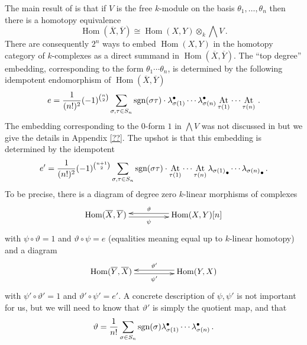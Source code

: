 \documentclass{compositio}
\theoremstyle{definition}
\numberwithin{equation}{section}
\def\Hom{\operatorname{Hom}}
\DeclareMathOperator{\At}{At}
\begin{document}
The main result of \cite{??} is that if $V$ is the free $k$-module on the basis $\theta_1,\ldots,\theta_n$ then there is a homotopy equivalence
\[
\Hom(\overline{X}, \overline{Y}) \cong \Hom(X,Y) \otimes_k \bigwedge V\,.
\]
There are consequently $2^n$ ways to embed $\Hom(X,Y)$ in the homotopy category of $k$-complexes as a direct summand in $\Hom(\overline{X}, \overline{Y})$. The ``top degree'' embedding, corresponding to the form $\theta_1 \cdots \theta_n$, is determined by the following idempotent endomorphism of $\Hom(\overline{X}, \overline{Y})$
\[
e = \frac{1}{(n!)^2} (-1)^{\binom{n}{2}}\sum_{\sigma,\tau \in S_n} \textup{sgn}(\sigma\tau) \cdot \lambda_{\sigma(1)}^\bullet \cdots \lambda_{\sigma(n)}^\bullet \At_{\tau(1)} \cdots \At_{\tau(n)}\,.
\]
The embedding corresponding to the $0$-form $1$ in $\bigwedge V$ was not discussed in \cite{??} but we give the details in Appendix \ref{??}. The upshot is that this embedding is determined by the idempotent
\[
e' = \frac{1}{(n!)^2} (-1)^{\binom{n+1}{2}}\sum_{\sigma, \tau \in S_n} \textup{sgn}(\sigma\tau) \cdot \At_{\tau(1)} \cdots \At_{\tau(n)} {\lambda_{\sigma(1)}}_\bullet \cdots {\lambda_{\sigma(n)}}_\bullet\,.
\]
To be precise, there is a diagram of degree zero $k$-linear morphisms of complexes
\[
\xymatrix@C+2pc{
\Hom(\overline{X}, \overline{Y}) \ar@<-0.5ex>[r]_-{\psi} & \Hom(X,Y)[n] \ar@<-0.5ex>[l]_-{\vartheta}
}
\]
with $\psi \circ \vartheta = 1$ and $\vartheta \circ \psi = e$ (equalities meaning equal up to $k$-linear homotopy) and a diagram
\[
\xymatrix@C+2pc{
\Hom(\overline{Y}, \overline{X}) \ar@<-0.5ex>[r]_-{\psi'} & \Hom(Y,X) \ar@<-0.5ex>[l]_-{\vartheta'}
}
\]
with $\psi' \circ \vartheta' = 1$ and $\vartheta' \circ \psi' = e'$. A concrete description of $\psi, \psi'$ is not important for us, but we will need to know that $\vartheta'$ is simply the quotient map, and that
\[
\vartheta = \frac{1}{n!} \sum_{\sigma \in S_n} \textup{sgn}(\sigma) \lambda_{\sigma(1)}^\bullet \cdots \lambda_{\sigma(n)}^{\bullet}\,.
\]
\end{document}
